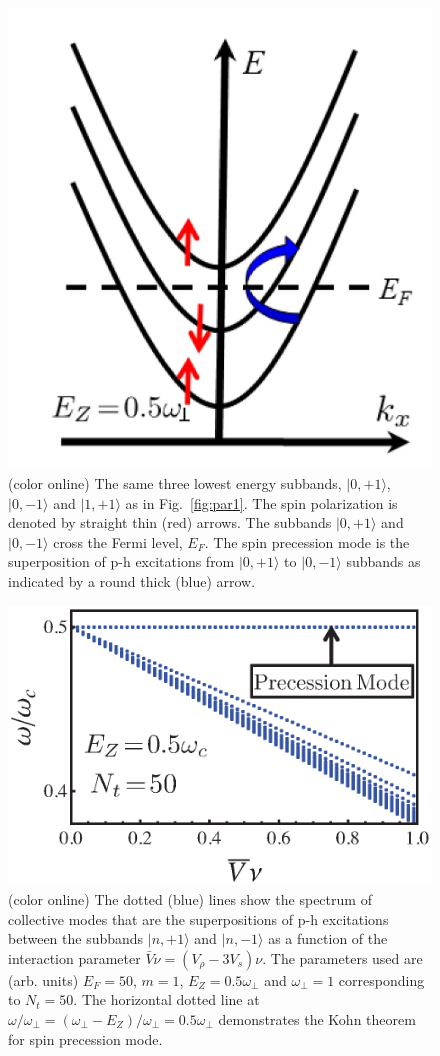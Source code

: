 \begin{figure}[h]
\begin{center}
\includegraphics[width=0.4\columnwidth]{fig10.jpg}
\caption{(color online) The same three lowest energy subbands, $|0,+1\rangle$, $|0,-1\rangle$ and $|1,+1\rangle$ as in Fig.~\ref{fig:par1}.
The spin polarization is denoted by straight thin (red) arrows. 
The subbands $|0,+1\rangle$ and $|0,-1\rangle$ cross the Fermi level, $E_F$.
The spin precession mode is the superposition of  p-h excitations from $|0,+1\rangle$ to $|0,-1\rangle$ subbands as indicated by a round thick (blue) arrow.\cite{Iqbal}}
\label{fig:par2}
\end{center}
\end{figure}

\begin{figure}[t!]
\begin{center}
\includegraphics[width=0.6\columnwidth]{fig11.eps}
\caption{ (color online) The dotted (blue) lines show the spectrum of collective modes that are the superpositions of p-h excitations between the subbands $|n,+1\rangle$ and $|n,-1\rangle$ as a function of the interaction parameter $\bar{V} \nu =(V_{\rho} - 3 V_s) \nu$.
The parameters used are (arb. units) $E_F = 50$,  $m=1$, $E_Z = 0.5 \omega_{\perp}$ and $\omega_{\perp} = 1$ corresponding to $N_t = 50$. 
The horizontal dotted line at $\omega/ \omega_{\perp}=(\omega_{\perp} - E_Z)/\omega_{\perp} = 0.5 \omega_{\perp}$ demonstrates the Kohn theorem for spin precession mode.\cite{Iqbal}}
\label{fig:app_precession}
\end{center}
\end{figure}

